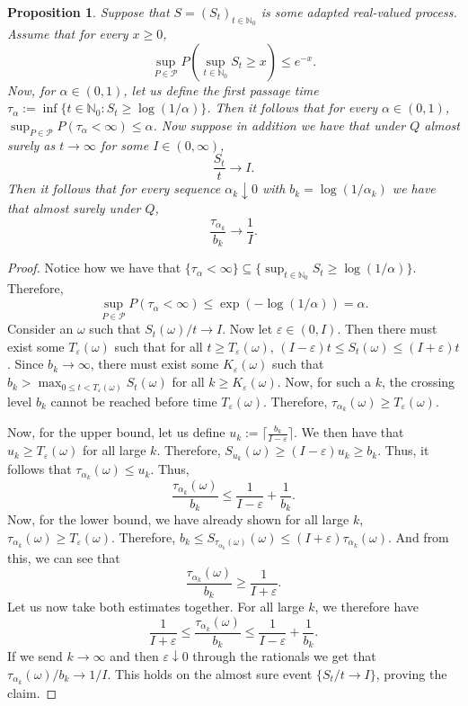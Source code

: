 \documentclass{article}
\newcommand{\NN}{\mathbb N}
\newcommand{\PP}{\mathcal P}
\newtheorem{proposition}[theorem]{Proposition}
\theoremstyle{definition}
\begin{document}
\begin{proposition}\label{prop:score-to-as}
Suppose that $S=(S_t)_{t\in\NN_0}$ is some adapted real-valued process. Assume that for every $x\ge 0$,
\[
\sup_{P\in\mathcal P}P\left(\sup_{t\in\NN_0}S_t\ge x\right)\le e^{-x}.
\]
Now, for $\alpha\in(0,1)$, let us define the first passage time $\tau_\alpha:=\inf\{t\in\NN_0: S_t\ge \log(1/\alpha)\}$. Then it follows that for every $\alpha\in(0,1)$, $\sup_{P\in\mathcal P}P(\tau_\alpha<\infty)\le \alpha$. Now suppose in addition we have that under $Q$ almost surely as $t\to\infty$ for some $I\in(0,\infty)$,
\[
\frac{S_t}{t}\longrightarrow I.
\]
Then it follows that for every sequence $\alpha_k\downarrow 0$ with $b_k=\log(1/\alpha_k)$ we have that almost surely under $Q$,
\[
\frac{\tau_{\alpha_k}}{b_k}\longrightarrow\frac{1}{I}.
\]
\end{proposition}

\begin{proof}
Notice how we have that $\{\tau_{\alpha}<\infty\}\subseteq\{\sup_{t\in\mathbb N_0}S_t\ge \log(1/\alpha)\}$. Therefore,
\[
\sup_{P\in\PP}P(\tau_\alpha<\infty)\le \exp(-\log(1/\alpha))=\alpha.
\]
Consider an $\omega$ such that $S_t(\omega)/t \to I$. Now let $\varepsilon\in(0,I)$. Then there must exist some $T_{\varepsilon}(\omega)$ such that for all $t\ge T_{\varepsilon}(\omega)$, $(I-\varepsilon)t\le S_t(\omega)\le(I+\varepsilon)t$. Since $b_k\to\infty$, there must exist some $K_{\varepsilon}(\omega)$ such that $b_k> \max_{0\le t < T_{\varepsilon}(\omega)} S_t(\omega)$ for all $k\ge K_{\varepsilon}(\omega)$. Now, for such a $k$, the crossing level $b_k$ cannot be reached before time $T_{\varepsilon}(\omega)$. Therefore, $\tau_{\alpha_k}(\omega)\ge T_{\varepsilon}(\omega)$. 

Now, for the upper bound, let us define $u_k:=\lceil \frac{b_k}{I-\varepsilon}\rceil$. We then have that $u_k\ge T_{\varepsilon}(\omega)$ for all large $k$. Therefore, $S_{u_k}(\omega)\ge (I-\varepsilon)u_k\ge b_k$. Thus, it follows that $\tau_{\alpha_k}(\omega)\le u_k$. Thus,
\[
\frac{\tau_{\alpha_k}(\omega)}{b_k}\le \frac{1}{I-\varepsilon}+\frac{1}{b_k}.
\]
Now, for the lower bound, we have already shown for all large $k$, $\tau_{\alpha_k}(\omega)\ge T_{\varepsilon}(\omega)$. Therefore, $b_k\le S_{\tau_{\alpha_k}(\omega)}(\omega)\le(I+\varepsilon)\tau_{\alpha_k}(\omega)$. And from this, we can see that
\[
\frac{\tau_{\alpha_k}(\omega)}{b_k}\ge \frac{1}{I+\varepsilon}.
\]
Let us now take both estimates together. For all large $k$, we therefore have
\[
\frac{1}{I+\varepsilon}\le \frac{\tau_{\alpha_k}(\omega)}{b_k}\le \frac{1}{I-\varepsilon}+\frac{1}{b_k}.
\]
If we send $k\to\infty$ and then $\varepsilon\downarrow 0$ through the rationals we get that $\tau_{\alpha_k}(\omega)/b_k \to 1/I$. This holds on the almost sure event $\{S_t/t\to I\}$, proving the claim.
\end{proof}
\end{document}
